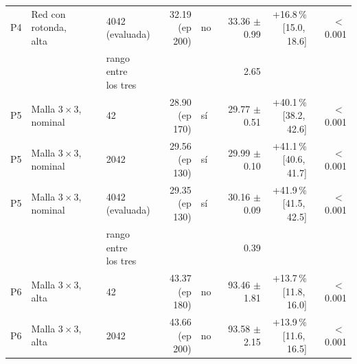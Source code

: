 \begin{table}[H]
\begin{tabular}{lllrlrrr}
P4 & \makecell[l]{Red con rotonda,\\{}alta} & \makecell[l]{4042\\{}(evaluada)} & \makecell[r]{32.19\\{}(ep 200)} & no & \makecell[r]{33.36\\{}$\pm$ 0.99} & \makecell[r]{+16.8\,\%\\{}[15.0,\,18.6]} & $<$\,0.001 \\
 & & \makecell[l]{rango entre\\{}los tres} & & & 2.65 & & \\
P5 & \makecell[l]{Malla $3 \times 3$,\\{}nominal} & 42 & \makecell[r]{28.90\\{}(ep 170)} & sí & \makecell[r]{29.77\\{}$\pm$ 0.51} & \makecell[r]{+40.1\,\%\\{}[38.2,\,42.6]} & $<$\,0.001 \\
P5 & \makecell[l]{Malla $3 \times 3$,\\{}nominal} & 2042 & \makecell[r]{29.56\\{}(ep 130)} & sí & \makecell[r]{29.99\\{}$\pm$ 0.10} & \makecell[r]{+41.1\,\%\\{}[40.6,\,41.7]} & $<$\,0.001 \\
P5 & \makecell[l]{Malla $3 \times 3$,\\{}nominal} & \makecell[l]{4042\\{}(evaluada)} & \makecell[r]{29.35\\{}(ep 130)} & sí & \makecell[r]{30.16\\{}$\pm$ 0.09} & \makecell[r]{+41.9\,\%\\{}[41.5,\,42.5]} & $<$\,0.001 \\
 & & \makecell[l]{rango entre\\{}los tres} & & & 0.39 & & \\
P6 & \makecell[l]{Malla $3 \times 3$,\\{}alta} & 42 & \makecell[r]{43.37\\{}(ep 180)} & no & \makecell[r]{93.46\\{}$\pm$ 1.81} & \makecell[r]{+13.7\,\%\\{}[11.8,\,16.0]} & $<$\,0.001 \\
P6 & \makecell[l]{Malla $3 \times 3$,\\{}alta} & 2042 & \makecell[r]{43.66\\{}(ep 200)} & no & \makecell[r]{93.58\\{}$\pm$ 2.15} & \makecell[r]{+13.9\,\%\\{}[11.6,\,16.5]} & $<$\,0.001 \\

\end{tabular}
\end{table}
